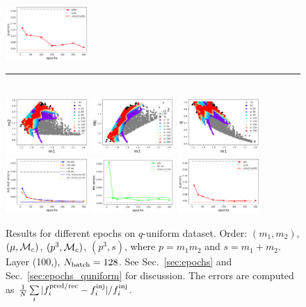 \documentclass[prd,aps,twocolumn,a4paper,showkeys,nofootinbib]{revtex4-1}
\def\Mc{{\cal M}_c}
\begin{document}
\begin{figure}[]
  \includegraphics[width=0.28\textwidth]{./Figs/quniform_p3Mc_err_q.png} \\
  \rule[1ex]{14cm}{0.5pt}\\
  \includegraphics[width=0.28\textwidth]{./Figs/quniform_p3s_rainbow_m1m2.png}
  \includegraphics[width=0.28\textwidth]{./Figs/quniform_p3s_rainbow_m1Mc.png}
  \includegraphics[width=0.28\textwidth]{./Figs/quniform_p3s_rainbow_m1q.png} \\
  \includegraphics[width=0.28\textwidth]{./Figs/quniform_p3s_err_m1m2.png}
  \includegraphics[width=0.28\textwidth]{./Figs/quniform_p3s_err_Mc.png}
  \includegraphics[width=0.28\textwidth]{./Figs/quniform_p3s_err_q.png} \\
  \caption{\label{fig:epochs_quniform} Results for different epochs on $q$-uniform dataset. Order:
  $(m_1, m_2)$, $(\mu, \Mc)$, $(p^3, \Mc)$, $(p^3, s)$, where
  $p=m_1 m_2$ and $s=m_1+m_2$. Layer (100,), $N_{\rm batch}=128$. 
  See Sec.~\ref{sec:epochs} and Sec.~\ref{sec:epochs_quniform} for discussion. 
  The errors are computed as
  $\frac{1}{N} \sum\limits_i |f_i^{\rm pred/rec} - f_i^{\rm inj}|/f_i^{\rm inj}$.}
\end{figure}
\end{document}
